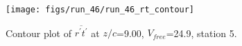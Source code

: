 \begin{figure}[H]
\centering
\texttt{[image: figs/run\_46/run\_46\_rt\_contour]}
\caption{Contour plot of $\overline{r^\prime t^\prime}$ at $z/c$=9.00, $V_{free}$=24.9, station 5.}
\end{figure}


